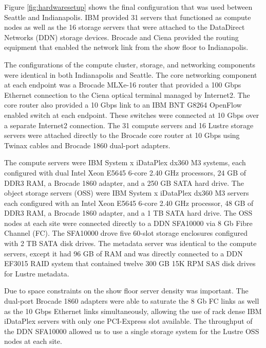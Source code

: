 \documentclass[]{sigplan-proc}
\begin{document}
Figure \ref{fig:hardwaresetup} shows the final configuration that was used between Seattle and
Indianapolis. IBM provided 31 servers that functioned as compute nodes as well as the 16 storage servers that
were attached to the DataDirect Networks (DDN) storage devices. Brocade and Ciena provided the routing
equipment that enabled the network link from the show floor to Indianapolis.

The configurations of the compute cluster, storage, and networking components were identical in both Indianapolis and
Seattle. The core networking component at each endpoint was a Brocade MLXe-16 router that provided a 100 Gbps
Ethernet connection to the Ciena optical terminal managed by Internet2. The core router also provided a 10
Gbps link to an IBM BNT G8264 OpenFlow enabled switch at each endpoint. These switches were connected at 10 Gbps
over a separate Internet2 connection. The 31 compute servers and 16 Lustre storage
servers were attached directly to the Brocade core router at 10 Gbps using Twinax cables and Brocade 1860
dual-port adapters.

The compute servers were IBM System x iDataPlex dx360 M3 systems, each configured with dual Intel Xeon E5645
6-core 2.40 GHz processors, 24 GB of DDR3 RAM, a Brocade 1860 adapter, and a 250 GB SATA hard drive. The
object storage servers (OSS) were IBM System x iDataPlex dx360 M3 servers each configured with an Intel Xeon
E5645 6-core 2.40 GHz processor, 48 GB of DDR3 RAM, a Brocade 1860 adapter, and a 1 TB SATA hard drive. The
OSS nodes at each site were connected directly to a DDN SFA10000 via 8 Gb Fibre Channel (FC). The SFA10000
drove five 60-slot storage enclosures configured with 2 TB SATA disk drives. The metadata server was identical
to the compute servers, except it had 96 GB of RAM and was directly connected to a DDN EF3015 RAID system that
contained twelve 300 GB 15K RPM SAS disk drives for Lustre metadata.

Due to space constraints on the show floor server density was important. The dual-port Brocade 1860 adapters
were able to saturate the 8 Gb FC links as well as the 10 Gbps Ethernet links simultaneously, allowing the use
of rack dense IBM iDataPlex servers with only one PCI-Express slot available. The throughput of the DDN
SFA10000 allowed us to use a single storage system for the Lustre OSS nodes at each site.
\end{document}
